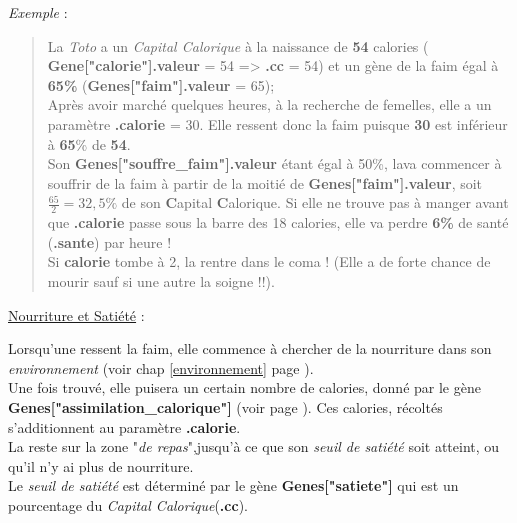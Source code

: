 \documentclass[french]{report}
\begin{document}
\textit{Exemple} :\\
\begin{quote}
	La \CoCiX \emph{Toto} a un \textit{Capital Calorique} à la naissance de \textbf{54} calories ( \textbf{Gene["calorie"].valeur} = 54 => \textbf{.cc} = 54) et un gène de la faim égal à \textbf{65\%} (\textbf{Genes["faim"].valeur} = 65); \\
	
	Après avoir marché quelques heures, à la recherche de femelles, elle a un paramètre \textbf{.calorie} = 30. Elle ressent donc la faim puisque \textbf{30} est inférieur à \textbf{65}\% de \textbf{54}.\\
	
	Son \textbf{Genes["souffre\_faim"].valeur} étant égal à 50\%, la\CoCiX va commencer à souffrir de la faim à partir de la moitié de \textbf{Genes["faim"].valeur}, soit $\frac{65}{2} = 32,5\%$ de son \textbf{C}apital \textbf{C}alorique. Si elle ne trouve pas à manger avant que \textbf{.calorie} passe sous la barre des 18 calories, elle va perdre \textbf{6\%} de santé (\textbf{.sante}) par heure !\\
	
	Si \textbf{calorie} tombe à 2, la \CoCiX  rentre dans le coma ! (Elle a de forte chance de mourir sauf si une autre \CoCiX la soigne !!).
\end{quote}


\begin{center}
	\underline{Nourriture et Satiété} :\label{nourrir}
\end{center}
Lorsqu'une \CoCiX ressent la faim, elle commence à chercher de la nourriture dans son \textit{environnement} (voir chap \ref{environnement} page \pageref{environnement}).\\
Une fois trouvé, elle puisera un certain nombre de calories, donné par le gène\\ \textbf{Genes["assimilation\_calorique"]} (voir page \pageref{liste_gene}). Ces calories, récoltés s'additionnent au paramètre \textbf{.calorie}.\\

La \CoCiX reste sur la zone "\textit{de repas}",jusqu'à ce que son \textit{seuil de satiété} soit atteint, ou qu'il n'y ai plus de nourriture.\\
Le \textit{seuil de satiété} est déterminé par le gène \textbf{Genes["satiete"]} qui est un pourcentage du \textit{Capital Calorique}(\textbf{.cc}).\\
\end{document}
